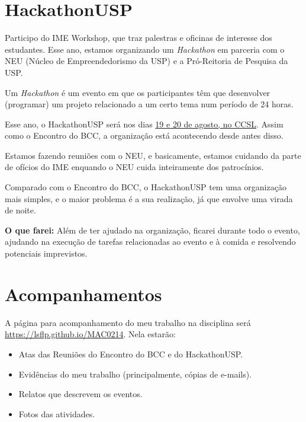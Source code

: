 \documentclass[12pt,letterpaper]{article}
\begin{document}
	\section{HackathonUSP}
	
	Participo do IME Workshop, que traz palestras e oficinas de interesse dos estudantes. Esse ano, estamos organizando um \textit{Hackathon} em parceria com o NEU (Núcleo de Empreendedorismo da USP) e a Pró-Reitoria de Pesquisa da USP.
	
	Um \textit{Hackathon} é um evento em que os participantes têm que desenvolver (programar) um projeto relacionado a um certo tema num período de 24 horas. 
	
	Esse ano, o HackathonUSP será nos dias \underline{19 e 20 de agosto, no CCSL}. Assim como o Encontro do BCC, a organização está acontecendo desde antes disso. 
	
	Estamos fazendo reuniões com o NEU, e basicamente, estamos cuidando da parte de ofícios do IME enquando o NEU cuida inteiramente dos patrocínios.
	
	Comparado com o Encontro do BCC, o HackathonUSP tem uma organização mais simples, e o maior problema é a sua realização, já que envolve uma virada de noite. 
	
	\textbf{O que farei:} Além de ter ajudado na organização, ficarei durante todo o evento, ajudando na execução de tarefas relacionadas ao evento e à comida e resolvendo potenciais imprevistos.
	
	\section{Acompanhamentos}
	
	A página para acompanhamento do meu trabalho na disciplina será \url{https://lsflp.github.io/MAC0214}. Nela estarão:
	
	\begin{itemize}
		\item Atas das Reuniões do Encontro do BCC e do HackathonUSP.
		\item Evidências do meu trabalho (principalmente, cópias de e-mails).
		\item Relatos que descrevem os eventos.
		\item Fotos das atividades.
	\end{itemize}

			 
\end{document}
